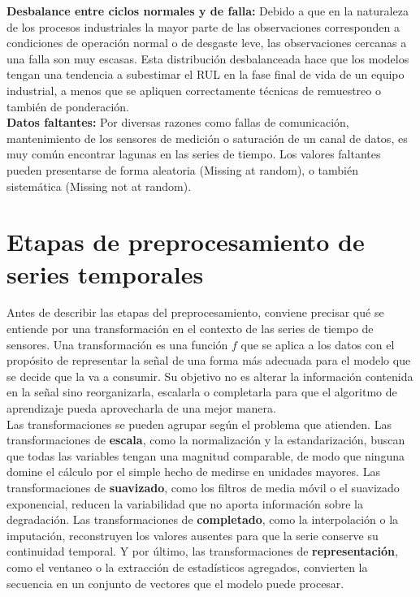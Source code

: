 \textbf{Desbalance entre ciclos normales y de falla:} Debido a que en la naturaleza de los procesos industriales la mayor parte de las observaciones corresponden a condiciones de operación normal o de desgaste leve, las observaciones cercanas a una falla son muy escasas. Esta distribución desbalanceada hace que los modelos tengan una tendencia a subestimar el RUL en la fase final de vida de un equipo industrial, a menos que se apliquen correctamente técnicas de remuestreo o también de ponderación.\\[.15cm]

\textbf{Datos faltantes:} Por diversas razones como fallas de comunicación, mantenimiento de los sensores de medición o saturación de un canal de datos, es muy común encontrar lagunas en las series de tiempo. Los valores faltantes pueden presentarse de forma aleatoria (Missing at random), o también sistemática (Missing not at random).\\[.15cm]

\section{Etapas de preprocesamiento de series temporales}

Antes de describir las etapas del preprocesamiento, conviene precisar qué se entiende por una transformación en el contexto de las series de tiempo de sensores. Una transformación es una función $f$ que se aplica a los datos con el propósito de representar la señal de una forma más adecuada para el modelo que se decide que la va a consumir. Su objetivo no es alterar la información contenida en la señal sino reorganizarla, escalarla o completarla para que el algoritmo de aprendizaje pueda aprovecharla de una mejor manera.\\[.15cm]

Las transformaciones se pueden agrupar según el problema que atienden. Las transformaciones de \textbf{escala}, como la normalización y la estandarización, buscan que todas las variables tengan una magnitud comparable, de modo que ninguna domine el cálculo por el simple hecho de medirse en unidades mayores. Las transformaciones de \textbf{suavizado}, como los filtros de media móvil o el suavizado exponencial, reducen la variabilidad que no aporta información sobre la degradación. Las transformaciones de \textbf{completado}, como la interpolación o la imputación, reconstruyen los valores ausentes para que la serie conserve su continuidad temporal. Y por último, las transformaciones de \textbf{representación}, como el ventaneo o la extracción de estadísticos agregados, convierten la secuencia en un conjunto de vectores que el modelo puede procesar.\\[.15cm]

